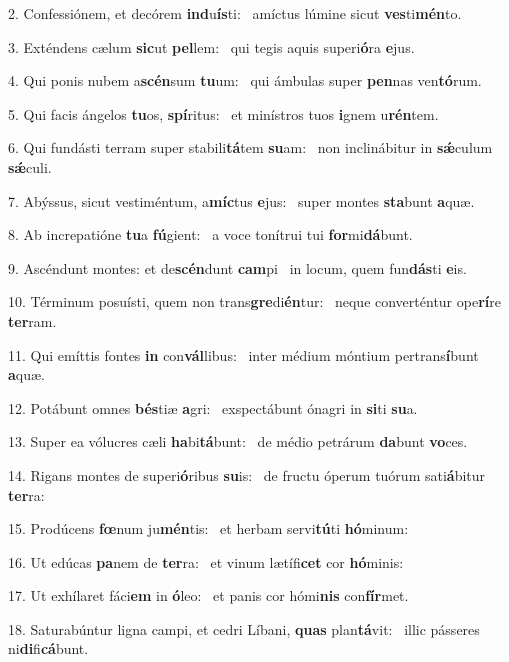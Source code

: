 2. Confessiónem, et decórem \textbf{ind}u\textbf{ís}ti: \ast\  amíctus lúmine sicut \textbf{ves}ti\textbf{mén}to.\

3. Exténdens cælum \textbf{sic}ut \textbf{pel}lem: \ast\  qui tegis aquis superi\textbf{ó}ra \textbf{e}jus.\

4. Qui ponis nubem a\textbf{scén}sum \textbf{tu}um: \ast\  qui ámbulas super \textbf{pen}nas ven\textbf{tó}rum.\

5. Qui facis ángelos \textbf{tu}os, \textbf{spí}ritus: \ast\  et minístros tuos \textbf{i}gnem u\textbf{rén}tem.\

6. Qui fundásti terram super stabili\textbf{tá}tem \textbf{su}am: \ast\  non inclinábitur in \textbf{sǽ}culum \textbf{sǽ}culi.\

7. Abýssus, sicut vestiméntum, a\textbf{míc}tus \textbf{e}jus: \ast\  super montes \textbf{sta}bunt \textbf{a}quæ.\

8. Ab increpatióne \textbf{tu}a \textbf{fú}gient: \ast\  a voce tonítrui tui \textbf{for}mi\textbf{dá}bunt.\

9. Ascéndunt montes: et de\textbf{scén}dunt \textbf{cam}pi \ast\  in locum, quem fun\textbf{dás}ti \textbf{e}is.\

10. Términum posuísti, quem non trans\textbf{gre}di\textbf{én}tur: \ast\  neque converténtur ope\textbf{rí}re \textbf{ter}ram.\

11. Qui emíttis fontes \textbf{in} con\textbf{vál}libus: \ast\  inter médium móntium pertrans\textbf{í}bunt \textbf{a}quæ.\

12. Potábunt omnes \textbf{bés}tiæ \textbf{a}gri: \ast\  exspectábunt ónagri in \textbf{si}ti \textbf{su}a.\

13. Super ea vólucres cæli \textbf{ha}bi\textbf{tá}bunt: \ast\  de médio petrárum \textbf{da}bunt \textbf{vo}ces.\

14. Rigans montes de superi\textbf{ó}ribus \textbf{su}is: \ast\  de fructu óperum tuórum sati\textbf{á}bitur \textbf{ter}ra:\

15. Prodúcens \textbf{fœ}num ju\textbf{mén}tis: \ast\  et herbam servi\textbf{tú}ti \textbf{hó}minum:\

16. Ut edúcas \textbf{pa}nem de \textbf{ter}ra: \ast\  et vinum lætífi\textbf{cet} cor \textbf{hó}minis:\

17. Ut exhílaret fáci\textbf{em} in \textbf{ó}leo: \ast\  et panis cor hómi\textbf{nis} con\textbf{fír}met.\

18. Saturabúntur ligna campi, et cedri Líbani, \textbf{quas} plan\textbf{tá}vit: \ast\  illic pásseres ni\textbf{di}fi\textbf{cá}bunt.\

